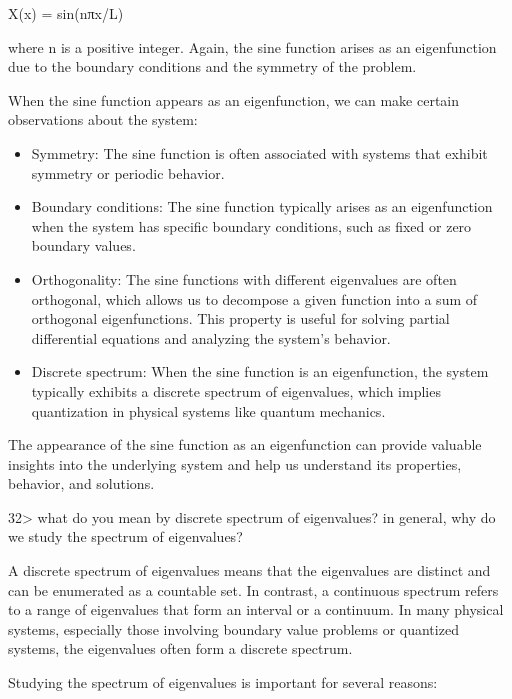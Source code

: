 \documentclass[
]{article}
\begin{document}
X(x) = sin(nπx/L)

where n is a positive integer. Again, the sine function arises as an
eigenfunction due to the boundary conditions and the symmetry of the
problem.

When the sine function appears as an eigenfunction, we can make certain
observations about the system:

\begin{itemize}
\item
  Symmetry: The sine function is often associated with systems that
  exhibit symmetry or periodic behavior.
\item
  Boundary conditions: The sine function typically arises as an
  eigenfunction when the system has specific boundary conditions, such
  as fixed or zero boundary values.
\item
  Orthogonality: The sine functions with different eigenvalues are often
  orthogonal, which allows us to decompose a given function into a sum
  of orthogonal eigenfunctions. This property is useful for solving
  partial differential equations and analyzing the system's behavior.
\item
  Discrete spectrum: When the sine function is an eigenfunction, the
  system typically exhibits a discrete spectrum of eigenvalues, which
  implies quantization in physical systems like quantum mechanics.
\end{itemize}

The appearance of the sine function as an eigenfunction can provide
valuable insights into the underlying system and help us understand its
properties, behavior, and solutions.

32\textgreater{} what do you mean by discrete spectrum of eigenvalues?
in general, why do we study the spectrum of eigenvalues?

A discrete spectrum of eigenvalues means that the eigenvalues are
distinct and can be enumerated as a countable set. In contrast, a
continuous spectrum refers to a range of eigenvalues that form an
interval or a continuum. In many physical systems, especially those
involving boundary value problems or quantized systems, the eigenvalues
often form a discrete spectrum.

Studying the spectrum of eigenvalues is important for several reasons:
\end{document}
